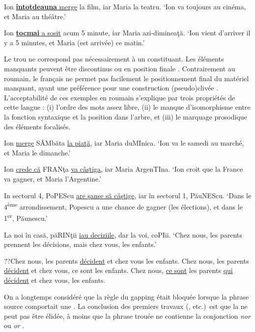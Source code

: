 \ex Ion \uline{\textbf{întotdeauna} merge} la film, iar Maria la teatru.
\glt ‘Ion va toujours au cinéma, et Maria au théâtre.’   

\ex Ion \uline{\textbf{tocmai} a sosit} acum 5 minute, iar Maria azi-dimineaţă.
\glt ‘Ion vient d’arriver il y a 5 minutes, et Maria (est arrivée) ce matin.’
\z
\z

Le trou ne correspond pas nécessairement à un constituant. Les éléments manquants peuvent être discontinus  ou en position finale . Contrairement au roumain, le français ne permet pas facilement le positionnement final du matériel manquant, ayant une préférence pour une construction (pseudo)clivée . L’acceptabilité de ces exemples en roumain s’explique par trois propriétés de cette langue : (i) l’ordre des mots assez libre, (ii) le manque d’isomorphisme entre la fonction syntaxique et la position dans l’arbre, et (iii) le marquage prosodique des éléments focalisés.

\ea \label{ch2:ex84}
\ea Ion \uline{merge} SÂMbăta \uline{la piaţă}, iar Maria duMInica.
\glt ‘Ion va le samedi au marché, et Maria le dimanche.’

\ex Ion \uline{crede că} FRANţa \uline{va câştiga}, iar Maria ArgenTIna.
\glt ‘Ion croit que la France va gagner, et Maria l’Argentine.’
\z
\z


\ea \label{ch2:ex85}
\ea In sectorul 4, PoPEScu \uline{are şanse să câştige}, iar în sectorul 1, PăuNEScu.
\glt  ‘Dans le 4\textsuperscript{ème} arrondissement, Popescu a une chance de gagner (les élections), et dans le 1\textsuperscript{er}, Păunescu.’

\ex La noi în casă, păRINţii \uline{iau deciziile}, dar la voi, coPIii.
\glt ‘Chez nous, les parents prennent les décisions, mais chez vous, les enfants.’
\z
\z


\ea \label{ch2:ex86}
\ea ??Chez nous, les parents \uline{décident} et chez vous les enfants.
\ex Chez nous, les parents \uline{décident} et chez vous, ce sont les enfants.
\ex Chez nous, \uline{ce sont} les parents \uline{qui décident} et chez vous, les enfants. \z
\z

On a longtemps considéré que la règle du gapping était bloquée lorsque la phrase source comportait une  \citep{Ross1967}. La conclusion des premiers travaux (\citealt{Ross1967,Jackendoff1971,Zribi-Hertz1986}, etc.)~est que la  ne peut pas être élidée, à moins que la phrase trouée ne contienne la conjonction \textit{nor} ou \textit{or} . 

